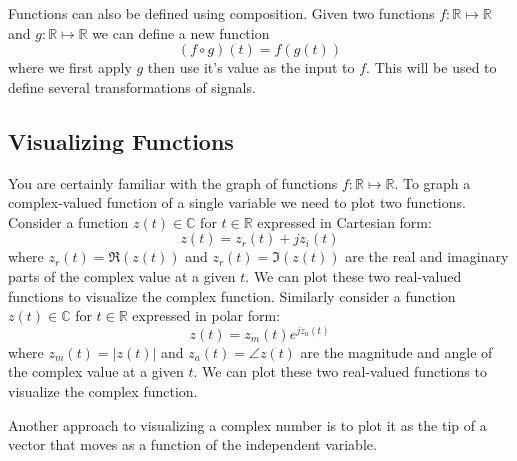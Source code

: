 Functions can also be defined using composition. Given two functions $f:\mathbb{R}\mapsto\mathbb{R}$ and $g:\mathbb{R}\mapsto\mathbb{R}$ we can define a new function
\[
(f \circ g)(t) = f(g(t)) 
\]
where we first apply $g$ then use it's value as the input to $f$. This will be used to define several transformations of signals.

\subsection*{Visualizing Functions}

You are certainly familiar with the graph of functions $f:\mathbb{R}\mapsto\mathbb{R}$. To graph a complex-valued function of a single variable we need to plot two functions. Consider a function $z(t) \in \mathbb{C}$ for $t \in \mathbb{R}$ expressed in Cartesian form:
\[
z(t) = z_r(t) + j z_i(t) 
\]
where $z_r(t) = \Re(z(t))$ and $z_r(t) = \Im(z(t))$ are the real and imaginary parts of the complex value at a given $t$. We can plot these two real-valued functions to visualize the complex function. Similarly consider a function $z(t) \in \mathbb{C}$ for $t \in \mathbb{R}$ expressed in polar form:
\[
z(t) = z_m(t) e^{jz_a(t)}
\]
where $z_m(t) = |z(t)|$ and $z_a(t) = \angle z(t)$ are the magnitude and angle of the complex value at a given $t$. We can plot these two real-valued functions to visualize the complex function.

Another approach to visualizing a complex number is to plot it as the tip of a vector that moves as a function of the independent variable.


